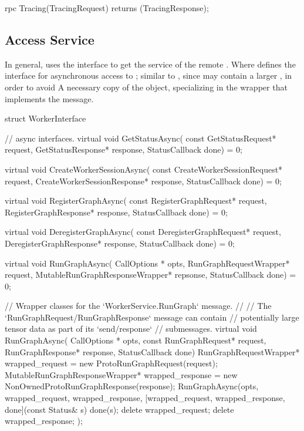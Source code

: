 \begin{content}
\begin{leftbar}
\begin{c++}
{  rpc Tracing(TracingRequest) 
      returns (TracingResponse);
}
\end{c++}
\end{leftbar}


\subsection{Access Service}
In general,  uses the interface  to get the service of the remote . Where  defines the interface for asynchronous access to ; similar to , since  may contain a larger , in order to avoid A necessary copy of the object, specializing in the wrapper that implements the message.

\begin{leftbar}
\begin{c++}
struct WorkerInterface {
  // async interfaces.
  virtual void GetStatusAsync(
      const GetStatusRequest* request,
      GetStatusResponse* response,
      StatusCallback done) = 0;

  virtual void CreateWorkerSessionAsync(
      const CreateWorkerSessionRequest* request,
      CreateWorkerSessionResponse* response, 
      StatusCallback done) = 0;

  virtual void RegisterGraphAsync(
      const RegisterGraphRequest* request,
      RegisterGraphResponse* response,
      StatusCallback done) = 0;

  virtual void DeregisterGraphAsync(
      const DeregisterGraphRequest* request,
      DeregisterGraphResponse* response,
      StatusCallback done) = 0;

  virtual void RunGraphAsync(
      CallOptions * opts, 
      RunGraphRequestWrapper* request,
      MutableRunGraphResponseWrapper* repsonse,
      StatusCallback done) = 0;

  // Wrapper classes for the `WorkerService.RunGraph` message.
  //
  // The `RunGraphRequest/RunGraphResponse` message can contain 
  // potentially large tensor data as part of its `send/response`
  // submessages.
  virtual void RunGraphAsync(
      CallOptions * opts, 
      const RunGraphRequest* request,
      RunGraphResponse* response, 
      StatusCallback done) {
    RunGraphRequestWrapper* wrapped_request = 
        new ProtoRunGraphRequest(request);
    MutableRunGraphResponseWrapper* wrapped_response =
        new NonOwnedProtoRunGraphResponse(response);
    RunGraphAsync(opts, wrapped_request, wrapped_response,
        [wrapped_request, wrapped_response, done](const Status& s) {
            done(s);
            delete wrapped_request;
            delete wrapped_response;
        });
  }

}
\end{c++}
\end{leftbar}
\end{content}
